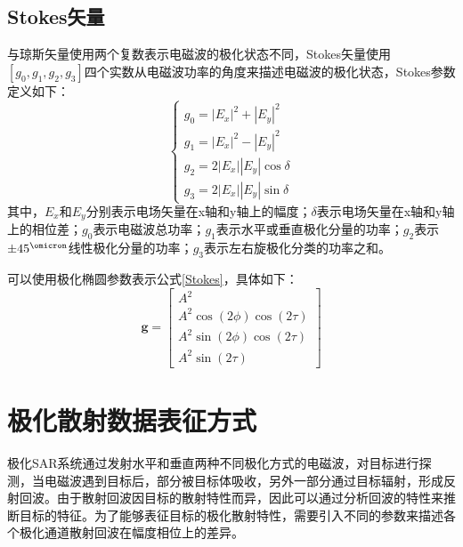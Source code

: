 \documentclass[promaster]{thesis-uestc}
\begin{document}
\subsection{Stokes矢量}
与琼斯矢量使用两个复数表示电磁波的极化状态不同，Stokes矢量使用$[g_0,g_1,g_2,g_3]$四个实数从电磁波功率的角度来描述电磁波的极化状态，Stokes参数定义如下：
\begin{equation}
    \label{Stokes}
    \left\{\begin{array}{l}
        g_0=\left|E_x\right|^2+\left|E_y\right|^2         \\
        g_1=\left|E_x\right|^2-\left|E_y\right|^2         \\
        g_2=2\left|E_x\right|\left|E_y\right| \cos \delta \\
        g_3=2\left|E_x\right|\left|E_y\right| \sin \delta
    \end{array}\right.
\end{equation}
其中，$E_x$和$E_y$分别表示电场矢量在x轴和y轴上的幅度；$\delta$表示电场矢量在x轴和y轴上的相位差；$g_0$表示电磁波总功率；$g_1$表示水平或垂直极化分量的功率；$g_2$表示$\pm 45^{\operatorname{\omicron}}$线性极化分量的功率；$g_3$表示左右旋极化分类的功率之和。

可以使用极化椭圆参数表示公式\ref{Stokes}，具体如下：
\begin{equation}
    \boldsymbol{g}=\left[\begin{array}{c}
            A^2                             \\
            A^2 \cos (2 \phi) \cos (2 \tau) \\
            A^2 \sin (2 \phi) \cos (2 \tau) \\
            A^2 \sin (2 \tau)
        \end{array}\right]
\end{equation}

\section{极化散射数据表征方式}
极化SAR系统通过发射水平和垂直两种不同极化方式的电磁波，对目标进行探测，当电磁波遇到目标后，部分被目标体吸收，另外一部分通过目标辐射，形成反射回波。由于散射回波因目标的散射特性而异，因此可以通过分析回波的特性来推断目标的特征。为了能够表征目标的极化散射特性，需要引入不同的参数来描述各个极化通道散射回波在幅度相位上的差异。
\end{document}
